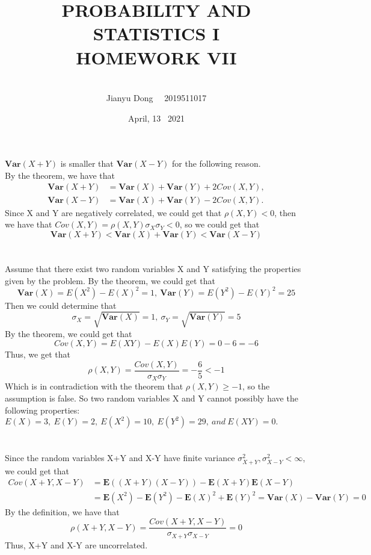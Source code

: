 \documentclass[10.5pt]{article}
\title{PROBABILITY AND STATISTICS I
\\HOMEWORK VII}
\author{\\Jianyu Dong   ~~2019511017}
\date{April, 13~ 2021}
\begin{document}
    
\maketitle
\newpage

\section{}
$\mathbf{Var}(X+Y)$ is smaller that $\mathbf{Var}(X-Y)$ for the following reason.\\\indent
By the theorem, we have that $$\begin{aligned}
    \mathbf{Var}(X+Y)&=\mathbf{Var}(X)+\mathbf{Var}(Y)+2Cov(X,Y),\\
    \mathbf{Var}(X-Y)&=\mathbf{Var}(X)+\mathbf{Var}(Y)-2Cov(X,Y).
\end{aligned}$$\indent
Since X and Y are negatively correlated, we could get that $\rho(X,Y)<0$, then we have that $Cov(X,Y)=\rho(X,Y)\sigma_X\sigma_Y<0$, so we could get that $$\mathbf{Var}(X+Y)<\mathbf{Var}(X)+\mathbf{Var}(Y)<\mathbf{Var}(X-Y)$$

\section{}
Assume that there exist two random variables X and Y satisfying the properties given by the problem. By the theorem, we could get that $$\mathbf{Var}(X)=E(X^2)-E(X)^2=1,~\mathbf{Var}(Y)=E(Y^2)-E(Y)^2=25$$\indent
Then we could determine that $$\sigma_X=\sqrt{\mathbf{Var}(X)}=1,~\sigma_Y=\sqrt{\mathbf{Var}(Y)}=5$$\indent
By the theorem, we could get that $$Cov(X,Y)=E(XY)-E(X)E(Y)=0-6=-6$$\indent
Thus, we get that $$\rho(X,Y)=\frac{Cov(X,Y)}{\sigma_X\sigma_Y}=-\frac{6}{5}<-1$$\indent
Which is in contradiction with the theorem that $\rho(X,Y)\geqslant -1$, so the assumption is false. So two random variables X and Y cannot possibly have the following properties: $E(X)=3,~E(Y)=2,~E(X^2)=10,~E(Y^2)=29,~and ~E(XY)=0.$

\section{}
Since the random variables X+Y and X-Y have finite variance $\sigma_{X+Y}^2,\sigma_{X-Y}^2<\infty$, we could get that $$\begin{aligned}
    Cov(X+Y,X-Y)&=\mathbf{E}((X+Y)(X-Y))-\mathbf{E}(X+Y)\mathbf{E}(X-Y)\\
    &=\mathbf{E}(X^2)-\mathbf{E}(Y^2)-\mathbf{E}(X)^2+\mathbf{E}(Y)^2=\mathbf{Var}(X)-\mathbf{Var}(Y)=0
\end{aligned}$$\indent
By the definition, we have that $$\rho(X+Y,X-Y)=\frac{Cov(X+Y,X-Y)}{\sigma_{X+Y}\sigma_{X-Y}}=0$$\indent
Thus, X+Y and X-Y are uncorrelated.
\end{document}
